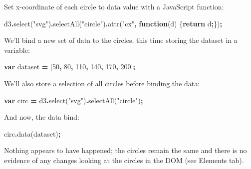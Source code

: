 \documentclass[
  openany]{book}
\newenvironment{Shaded}{\begin{snugshade}}{\end{snugshade}}
\newcommand{\ControlFlowTok}[1]{\textcolor[rgb]{0.13,0.29,0.53}{\textbf{#1}}}
\newcommand{\DecValTok}[1]{\textcolor[rgb]{0.00,0.00,0.81}{#1}}
\newcommand{\FunctionTok}[1]{\textcolor[rgb]{0.00,0.00,0.00}{#1}}
\newcommand{\KeywordTok}[1]{\textcolor[rgb]{0.13,0.29,0.53}{\textbf{#1}}}
\newcommand{\NormalTok}[1]{#1}
\newcommand{\OperatorTok}[1]{\textcolor[rgb]{0.81,0.36,0.00}{\textbf{#1}}}
\newcommand{\StringTok}[1]{\textcolor[rgb]{0.31,0.60,0.02}{#1}}
\begin{document}
Set x-coordinate of each circle to data value with a JavaScript function:

\begin{Shaded}
\begin{Highlighting}[]
\NormalTok{d3}\OperatorTok{.}\FunctionTok{select}\NormalTok{(}\StringTok{"svg"}\NormalTok{)}\OperatorTok{.}\FunctionTok{selectAll}\NormalTok{(}\StringTok{"circle"}\NormalTok{)}\OperatorTok{.}\FunctionTok{attr}\NormalTok{(}\StringTok{"cx"}\OperatorTok{,} \KeywordTok{function}\NormalTok{(d) \{}\ControlFlowTok{return}\NormalTok{ d}\OperatorTok{;}\NormalTok{\})}\OperatorTok{;}
\end{Highlighting}
\end{Shaded}

We'll bind a new set of data to the circles, this time storing the dataset in a variable:

\begin{Shaded}
\begin{Highlighting}[]
\KeywordTok{var}\NormalTok{ dataset }\OperatorTok{=}\NormalTok{ [}\DecValTok{50}\OperatorTok{,} \DecValTok{80}\OperatorTok{,} \DecValTok{110}\OperatorTok{,} \DecValTok{140}\OperatorTok{,} \DecValTok{170}\OperatorTok{,} \DecValTok{200}\NormalTok{]}\OperatorTok{;}
\end{Highlighting}
\end{Shaded}

We'll also store a selection of all circles before binding the data:

\begin{Shaded}
\begin{Highlighting}[]
\KeywordTok{var}\NormalTok{ circ }\OperatorTok{=}\NormalTok{ d3}\OperatorTok{.}\FunctionTok{select}\NormalTok{(}\StringTok{"svg"}\NormalTok{)}\OperatorTok{.}\FunctionTok{selectAll}\NormalTok{(}\StringTok{"circle"}\NormalTok{)}\OperatorTok{;}
\end{Highlighting}
\end{Shaded}

And now, the data bind:

\begin{Shaded}
\begin{Highlighting}[]
\NormalTok{circ}\OperatorTok{.}\FunctionTok{data}\NormalTok{(dataset)}\OperatorTok{;}
\end{Highlighting}
\end{Shaded}

Nothing appears to have happened; the circles remain the same and there is no evidence of any changes looking at the circles in the DOM (see Elements tab).
\end{document}
